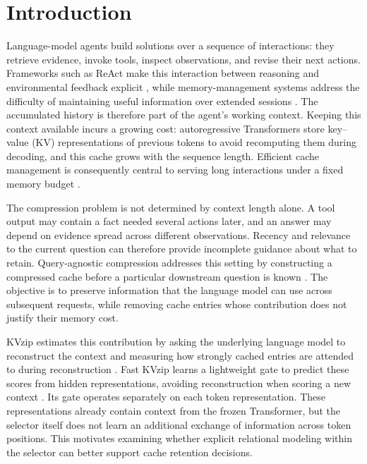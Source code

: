 \section{Introduction}
\label{sec:introduction}

Language-model agents build solutions over a sequence of interactions: they retrieve evidence, invoke tools, inspect observations, and revise their next actions. Frameworks such as ReAct make this interaction between reasoning and environmental feedback explicit \citep{yao2023react}, while memory-management systems address the difficulty of maintaining useful information over extended sessions \citep{packer2023memgpt}. The accumulated history is therefore part of the agent's working context. Keeping this context available incurs a growing cost: autoregressive Transformers store key--value (KV) representations of previous tokens to avoid recomputing them during decoding, and this cache grows with the sequence length. Efficient cache management is consequently central to serving long interactions under a fixed memory budget \citep{kwon2023pagedattention}.

The compression problem is not determined by context length alone. A tool output may contain a fact needed several actions later, and an answer may depend on evidence spread across different observations. Recency and relevance to the current question can therefore provide incomplete guidance about what to retain. Query-agnostic compression addresses this setting by constructing a compressed cache before a particular downstream question is known \citep{kim2025kvzip}. The objective is to preserve information that the language model can use across subsequent requests, while removing cache entries whose contribution does not justify their memory cost.

KVzip estimates this contribution by asking the underlying language model to reconstruct the context and measuring how strongly cached entries are attended to during reconstruction \citep{kim2025kvzip}. Fast KVzip learns a lightweight gate to predict these scores from hidden representations, avoiding reconstruction when scoring a new context \citep{kim2026fastkvzip}. Its gate operates separately on each token representation. These representations already contain context from the frozen Transformer, but the selector itself does not learn an additional exchange of information across token positions. This motivates examining whether explicit relational modeling within the selector can better support cache retention decisions.

